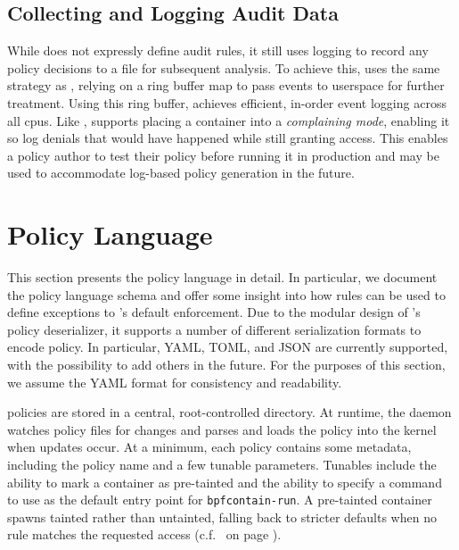 \subsection{Collecting and Logging Audit Data}%
\label{ss:bpfcontain-audit}

While \bpfcontain{} does not expressly define audit rules, it still uses logging to record
any policy decisions to a file for subsequent analysis. To achieve this, \bpfcontain{}
uses the same strategy as \bpfbox{}, relying on a ring buffer map to pass events to
userspace for further treatment. Using this ring buffer, \bpfcontain{} achieves efficient,
in-order event logging across all \glspl{cpu}. Like \bpfbox{}, \bpfcontain{} supports
placing a container into a \textit{complaining mode}, enabling it so log denials that
would have happened while still granting access. This enables a policy author to test
their policy before running it in production and may be used to accommodate log-based
policy generation in the future.



\section{\bpfcontain{} Policy Language}%
\label{s:bpfcontain-policy}

This section presents the \bpfcontain{} policy language in detail. In particular, we
document the policy language schema and offer some insight into how rules can be used to
define exceptions to \bpfcontain{}'s default enforcement. Due to the modular design of
\bpfcontain{}'s policy deserializer, it supports a number of different serialization
formats to encode policy. In particular, YAML, TOML, and JSON are currently supported,
with the possibility to add others in the future. For the purposes of this section, we
assume the YAML format for consistency and readability.

\bpfcontain{} policies are stored in a central, root-controlled directory. At runtime, the
daemon watches policy files for changes and parses and loads the policy into the kernel
when updates occur. At a minimum, each \bpfcontain{} policy contains some metadata,
including the policy name and a few tunable parameters. Tunables include the ability to
mark a container as pre-tainted and the ability to specify a command to use as the default
entry point for \texttt{bpfcontain-run}. A pre-tainted container spawns tainted rather than
untainted, falling back to stricter defaults when no rule matches the requested access
(c.f.\  on page \pageref{fig:bpfcontain-enforcement}).

